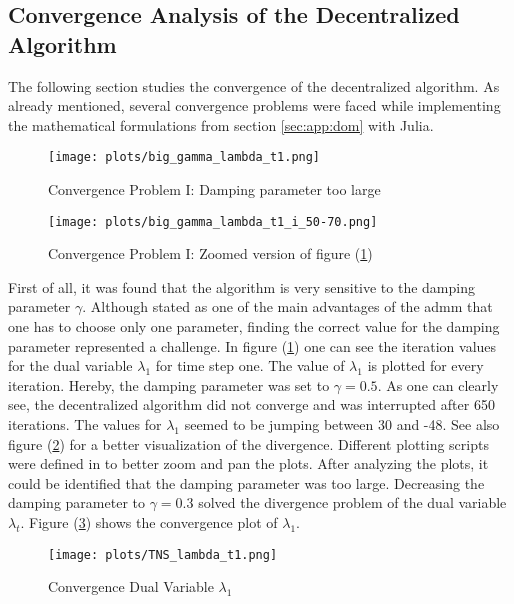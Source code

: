 \subsection{Convergence Analysis of the Decentralized Algorithm}

The following section studies the convergence of the decentralized algorithm. As already mentioned, several convergence problems were faced while implementing the mathematical formulations from section \ref{sec:app:dom} with Julia. \\

\begin{figure}[h!]
	\centering
	\texttt{[image: plots/big\_gamma\_lambda\_t1.png]}
	\caption{Convergence Problem I: Damping parameter too large}
	\label{fig:conv-problem-1}
\end{figure}

\begin{figure}[h!]
	\centering
	\texttt{[image: plots/big\_gamma\_lambda\_t1\_i\_50-70.png]}
	\caption{Convergence Problem I: Zoomed version of figure (\ref{fig:conv-problem-1})}
	\label{fig:conv-problem-1-zoom}
\end{figure}

First of all, it was found that the algorithm is very sensitive to the damping parameter $\gamma$. Although stated as one of the main advantages of the \gls{admm} that one has to choose only one parameter, finding the correct value for the damping parameter represented a challenge. In figure (\ref{fig:conv-problem-1}) one can see the iteration values for the dual variable $\lambda_1$ for time step one. The value of $\lambda_1$ is plotted for every iteration. Hereby, the damping parameter was set to $\gamma = 0.5$. As one can clearly see, the decentralized algorithm did not converge and was interrupted after 650 iterations. The values for $\lambda_1$ seemed to be jumping between 30 and -48. See also figure (\ref{fig:conv-problem-1-zoom}) for a better visualization of the divergence. Different plotting scripts were defined in  to better zoom and pan the plots. After analyzing the plots, it could be identified that the damping parameter was too large. Decreasing the damping parameter to $\gamma = 0.3$ solved the divergence problem of the dual variable $\lambda_t$. Figure (\ref{fig:conv-lambda}) shows the convergence plot of $\lambda_1$. \\

\begin{figure}[h!]
	\centering
	\texttt{[image: plots/TNS\_lambda\_t1.png]}
	\caption{Convergence Dual Variable $\lambda_1$}
	\label{fig:conv-lambda}
\end{figure}

